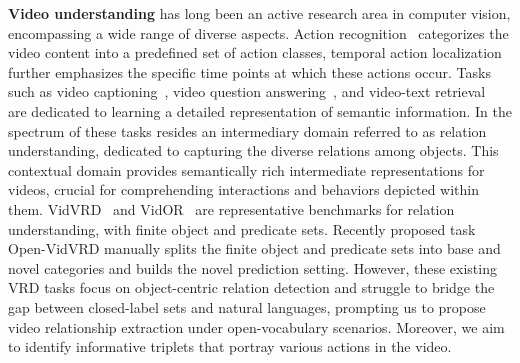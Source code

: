 \documentclass[letterpaper]{article}
\begin{document}
\textbf{Video understanding} has long been an active research area in computer vision, encompassing a wide range of diverse aspects.
Action recognition~\cite{Kay2017TheKH,8237884,monfortmoments} categorizes the video content into a predefined set of action classes, temporal action localization~\cite{Hei2015anet,liu2022fineaction} further emphasizes the specific time points at which these actions occur.
Tasks such as video captioning~\cite{chen2019deep}, video question answering~\cite{qian2023locate}, and video-text retrieval~\cite{song2021spatial} are dedicated to learning a detailed representation of semantic information.
In the spectrum of these tasks resides an intermediary domain referred to as relation understanding,  dedicated to capturing the diverse relations among objects.
This contextual domain provides semantically rich intermediate representations for videos, crucial for comprehending interactions and behaviors depicted within them.
VidVRD~\cite{Shang2017VideoVR} and VidOR~\cite{shang2019annotating} are representative benchmarks for relation understanding, with finite object and predicate sets.
Recently proposed task Open-VidVRD \cite{gao2023compositional} manually splits the finite object and predicate sets into base and novel categories and builds the novel prediction setting.
However, these existing VRD tasks focus on object-centric relation detection and struggle to bridge the gap between closed-label sets and natural languages, prompting us to propose video relationship extraction under open-vocabulary scenarios.
Moreover, we aim to identify informative triplets that portray various actions in the video.
\end{document}
